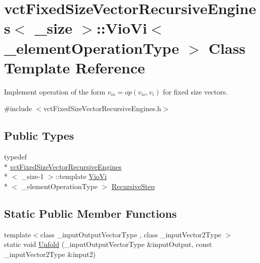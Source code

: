 \hypertarget{classvct_fixed_size_vector_recursive_engines_1_1_vio_vi}{\section{vct\-Fixed\-Size\-Vector\-Recursive\-Engines$<$ \-\_\-size $>$\-:\-:Vio\-Vi$<$ \-\_\-element\-Operation\-Type $>$ Class Template Reference}
\label{classvct_fixed_size_vector_recursive_engines_1_1_vio_vi}
}


Implement operation of the form $v_{io} = op(v_{io}, v_i)$ for fixed size vectors.  




{\ttfamily \#include $<$vct\-Fixed\-Size\-Vector\-Recursive\-Engines.\-h$>$}

\subsection*{Public Types}
\begin{DoxyCompactItemize}
\item 
typedef \\*
\hyperlink{classvct_fixed_size_vector_recursive_engines}{vct\-Fixed\-Size\-Vector\-Recursive\-Engines}\\*
$<$ \-\_\-size-\/1 $>$\-::template \hyperlink{classvct_fixed_size_vector_recursive_engines_1_1_vio_vi}{Vio\-Vi}\\*
$<$ \-\_\-element\-Operation\-Type $>$ \hyperlink{classvct_fixed_size_vector_recursive_engines_1_1_vio_vi_a1b0e842f1ca3b4e60a18b11e85382449}{Recursive\-Step}
\end{DoxyCompactItemize}
\subsection*{Static Public Member Functions}
\begin{DoxyCompactItemize}
\item 
{\footnotesize template$<$class \-\_\-input\-Output\-Vector\-Type , class \-\_\-input\-Vector2\-Type $>$ }\\static void \hyperlink{classvct_fixed_size_vector_recursive_engines_1_1_vio_vi_a936aa5043ac96ec178f26df243e6afc7}{Unfold} (\-\_\-input\-Output\-Vector\-Type \&input\-Output, const \-\_\-input\-Vector2\-Type \&input2)
\end{DoxyCompactItemize}


